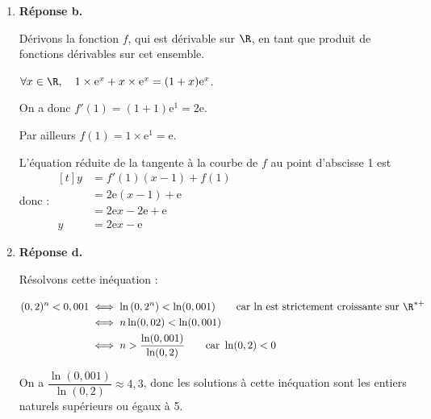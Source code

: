 \begin{enumerate}
			Si $K_\textbf{c} : x \longmapsto \dfrac{1}{2} H(2x)$, alors,

			$\forall x \in \R, K_\textbf{c}' (x) = \dfrac{1}{2}\times 2H'(2x) = H'(2x) = h(2x)$, car $H$ est une primitive de $h$ sur $\R$

			et donc on a : $\forall x \in \R, K_\textbf{c}' (x) = k(x)$.

			On en déduit donc que $K_\textbf{c}$ est une primitive de $k$ sur $\R$.

			\item \textbf{Réponse b.}

			Dérivons la fonction $f$, qui est dérivable sur $\R$, en tant que produit de fonctions dérivables sur cet ensemble.

			$\forall x \in \R, \quad 1 \times \mathrm{e}^x + x \times \mathrm{e}^x = (1 + x)\mathrm{e}^x$.

			On a donc $f'(1) = (1 + 1)\mathrm{e}^1 = 2\mathrm{e}$.

			Par ailleurs $f(1) = 1\times \mathrm{e}^1 = \mathrm{e}$.

			L'équation réduite de la tangente à la courbe de $f$ au point d'abscisse 1 est donc :
			$\begin{aligned}[t] y &= f'(1) (x - 1) + f(1)\\ &= 2\mathrm{e} (x - 1) + \mathrm{e} \\&= 2\mathrm{e}x - 2\mathrm{e} + \mathrm{e} \\y&= 2\mathrm{e}x - \mathrm{e}\end{aligned}$

			\item \textbf{Réponse d.}

			Résolvons cette inéquation :

			$ \begin{aligned} [t] (0,2)^n < 0,001 &\iff \ln\left(0,2^n\right) < \ln(0,001) \text{\qquad car ln est strictement croissante sur }\R^{*+}\\
			&\iff n\ln(0,02) < \ln(0,001)\\
			&\iff n > \dfrac{\ln(0,001)}{\ln(0,2)} \text{\qquad car } \ln(0,2)< 0
			\end{aligned}$

			On a $\dfrac{\ln(0,001)}{\ln(0,2)} \approx 4,3$, donc les solutions à cette inéquation sont les entiers naturels supérieurs ou égaux à 5.
		\end{enumerate}

\bigskip
